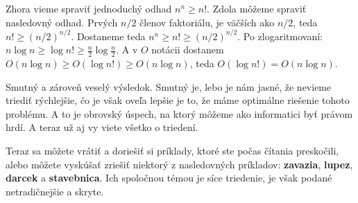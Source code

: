 Zhora vieme spraviť jednoduchý odhad $n^n \geq n!$. Zdola môžeme spraviť nasledovný odhad. Prvých
$n/2$ členov faktoriálu, je väčších ako $n/2$, teda $n! \geq (n/2)^{n/2}$.
Dostaneme teda $n^n \geq n! \geq (n/2)^{n/2}$. 
Po zlogaritmovaní: $n\log n \geq \log n! \geq \frac{n}{2} \log \frac{n}{2}$. A v $O$ notácii
dostanem $O(n\log n) \geq O(\log n!) \geq O(n\log n)$, teda $O(\log n!) = O(n \log n)$.

Smutný a zároveň veselý výsledok. Smutný je, lebo je nám jasné, že nevieme triediť rýchlejšie, čo je
však oveľa lepšie je to, že máme optimálne riešenie tohoto problému. A to je obrovský úspech, na
ktorý môžeme ako informatici byť právom hrdí. A teraz už aj vy viete všetko o triedení.

\medskip

Teraz sa môžete vrátiť a doriešiť si príklady, ktoré ste počas čítania preskočili, alebo môžete
vyskúšať zriešiť niektorý z nasledovných príkladov: \textbf{zavazia}, \textbf{lupez}, \textbf{darcek} a \textbf{stavebnica}.
Ich spoločnou témou je síce triedenie, je však podané netradičnejšie a skryte.


